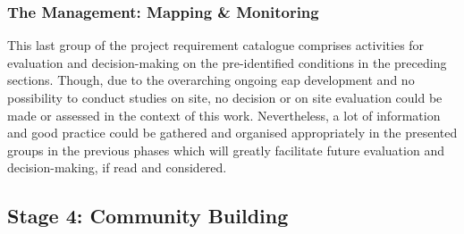 \subsubsection{The Management: Mapping \& Monitoring}

This last group of the project requirement catalogue comprises activities for evaluation and decision-making on the pre-identified conditions in the preceding sections. Though, due to the overarching ongoing \acrshort{eap} development and no possibility to conduct studies on site, no decision or on site evaluation could be made or assessed in the context of this work. Nevertheless, a lot of information and good practice could be gathered and organised appropriately in the presented groups in the previous phases which will greatly facilitate future evaluation and decision-making, if read and considered. %


\subsection{Stage 4: Community Building}\label{subsec:stage4_appl} %

